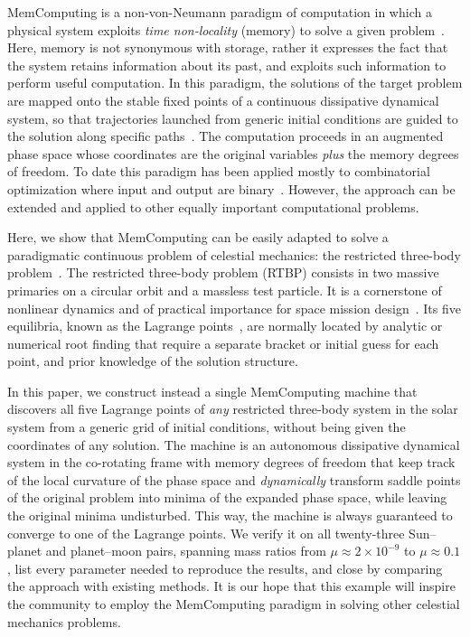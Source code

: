 \documentclass[aip,preprint,amsmath,amssymb,floatfix]{revtex4-2}
\begin{document}
MemComputing is a non-von-Neumann paradigm of computation in which a physical system exploits
\emph{time non-locality} (memory) to solve a given 
problem~\cite{diventra2022}. Here, memory is not synonymous with storage, rather it expresses the fact that the 
system retains information about its past, and exploits such information to perform useful computation. 
In this paradigm, the solutions of the target
problem are mapped onto the stable fixed points of a continuous dissipative dynamical system,
so that trajectories launched from generic initial conditions are guided to the
solution along specific paths~\cite{bearden2020efficient,diventra2018}. The computation
proceeds in an augmented phase space whose coordinates are the original
variables \emph{plus} the memory degrees of freedom. To date this paradigm has
been applied mostly to combinatorial optimization where input and output are binary~\cite{diventra2022,traversa2017}. However, the approach can be extended and applied to other 
equally important computational problems. 

Here, we show that MemComputing can be easily adapted to 
solve a paradigmatic continuous problem of celestial mechanics: the restricted three-body problem~\cite{szebehely1967}. 
The restricted three-body problem (RTBP) consists in two massive primaries on a circular
orbit and a massless test particle. It is a cornerstone of nonlinear dynamics and
of practical importance for space mission design~\cite{szebehely1967,Koon}. Its five equilibria, known as the
Lagrange points~\cite{lagrange1772}, are normally located by analytic or
numerical root finding that require a separate bracket or initial guess for each
point, and prior knowledge of the solution structure. 

In this paper, we construct instead a
single MemComputing machine that discovers all five Lagrange points of \emph{any} restricted
three-body system in the solar system from a generic grid of initial conditions,
without being given the coordinates of any solution. The machine is an autonomous dissipative dynamical system in the co-rotating
frame with memory degrees of
freedom that keep track of the local curvature of the phase space and {\it dynamically} transform saddle points of 
the original problem into 
minima of the expanded phase space, while leaving the original minima undisturbed. This way, the machine is always guaranteed to converge to one 
of the Lagrange points. We verify it on all
twenty-three Sun--planet and planet--moon pairs, spanning mass ratios from
$\mu \approx 2\times10^{-9}$ to $\mu \approx 0.1$, list every parameter needed to
reproduce the results, and close by comparing the approach with existing methods. It is our hope that this example will inspire the community to employ the MemComputing paradigm in solving other celestial mechanics problems. 
\end{document}
